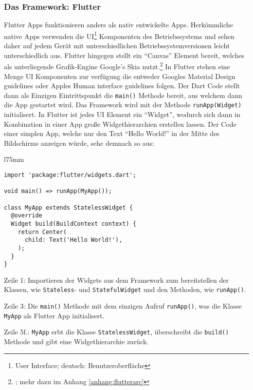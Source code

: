 \subsubsection{Das Framework: Flutter}

Flutter Apps funktionieren anders als nativ entwickelte Apps. Herkömmliche native Apps verwenden die UI\footnote{User Interface; deutsch: Benutzeroberfläche} Komponenten des Betriebssystems und sehen daher auf jedem Gerät mit unterschiedlichen Betriebssystemversionen leicht unterschiedlich aus. Flutter hingegen stellt ein "`Canvas"' Element bereit, welches als unterliegende Grafik-Engine Google's Skia nutzt.\footnote{\cite{flutterarchitecture}; mehr dazu im Anhang \ref{anhang:flutterarc}} In Flutter stehen eine Menge UI Komponenten zur verfügung die entweder Googles Material Design guidelines oder Apples Human interface guidelines folgen. Der Dart Code stellt dann als Einzigen Eintrittspunkt die \texttt{main()} Methode bereit, aus welchem dann die App gestartet wird. Das Framework wird mit der Methode \texttt{runApp(Widget)} initialisert. In Flutter ist jedes UI Element ein "`Widget"', wodurch sich dann in Kombination in einer App große Widgethierarchien erstellen lassen. Der Code einer simplen App, welche nur den Text "`Hello World!"' in der Mitte des Bildschirms anzeigen würde, sehe demnach so aus:

\begin{wrapfigure}{l}{75mm} 
    \begin{verbatim}
import 'package:flutter/widgets.dart';

void main() => runApp(MyApp());

class MyApp extends StatelessWidget {
  @override
  Widget build(BuildContext context) {
    return Center(
      child: Text('Hello World!'),
    );
  }
}
\end{verbatim}
\end{wrapfigure}

Zeile 1: Importieren der Widgets aus dem Framework zum bereitstellen der Klassen, wie \texttt{Stateless}- und \texttt{StatefulWidget} und den Methoden, wie \texttt{runApp()}.

Zeile 3: Die \texttt{main()} Methode mit dem einzigen Aufruf \texttt{runApp()}, was die Klasse \texttt{MyApp} als Flutter App initialisert.

Zeile 5f.: \texttt{MyApp} erbt die Klasse \texttt{StatelessWidget}, überschreibt die \texttt{build()} Methode und gibt eine Widgethierarchie zurück.

